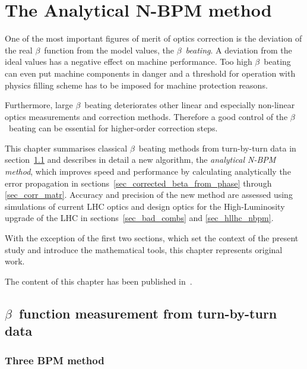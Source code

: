 \chapter{The Analytical N-BPM method}
\label{ch_anbpm}

\begin{chapterinfo}
One of the most important figures of merit of optics correction is the deviation of the real $\beta$~function
from the model values,
the $\beta$~\emph{beating}. A deviation from the ideal values has a negative effect on machine performance.
Too high $\beta$~beating can even put machine components in danger and a threshold for operation with
physics filling scheme has to be imposed for machine protection reasons.

Furthermore, large $\beta$~beating deteriorates other linear and especially non-linear optics measurements
and correction methods. Therefore a good control of the $\beta$~beating can be essential for higher-order
correction steps.

This chapter summarises classical $\beta$~beating methods from turn-by-turn data in section~\ref{sec_classical_beta_meas}
and describes in detail a new algorithm, the \emph{analytical N-BPM method},
which improves speed and performance by calculating analytically the error propagation
in sections~\ref{sec_corrected_beta_from_phase} through \ref{sec_corr_matr}.
Accuracy and precision of the new method are assessed using simulations of current LHC optics and design
optics for the High-Luminosity upgrade of the LHC in sections~\ref{sec_bad_combs} and \ref{sec_hllhc_nbpm}.

With the exception of the first two sections, which set the context of the present study and introduce the
mathematical tools, this chapter represents original work.

The content of this chapter has been published in~\cite{Wegscheider2017}.

\end{chapterinfo}

\section{\texorpdfstring{$\beta$}{beta}~function measurement from turn-by-turn data}
\label{sec_classical_beta_meas}

\subsection{Three BPM method}

